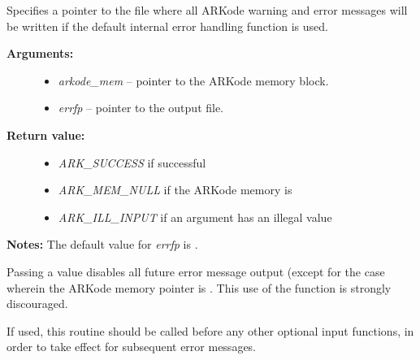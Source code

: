 \documentclass[letterpaper,10pt,english]{sphinxmanual}
\begin{document}
\begin{fulllineitems}
\label{c_interface/User_callable:c.ARKodeSetErrFile}
Specifies a pointer to the file where all ARKode warning and error
messages will be written if the default internal error handling
function is used.
\begin{description}
\item[{\textbf{Arguments:}}] \leavevmode\begin{itemize}
\item {} 
\emph{arkode\_mem} -- pointer to the ARKode memory block.

\item {} 
\emph{errfp} -- pointer to the output file.

\end{itemize}

\item[{\textbf{Return value:}}] \leavevmode\begin{itemize}
\item {} 
\emph{ARK\_SUCCESS} if successful

\item {} 
\emph{ARK\_MEM\_NULL} if the ARKode memory is 

\item {} 
\emph{ARK\_ILL\_INPUT} if an argument has an illegal value

\end{itemize}

\end{description}

\textbf{Notes:} The default value for \emph{errfp} is .

Passing a  value disables all future error message output
(except for the case wherein the ARKode memory pointer is
.  This use of the function is strongly discouraged.

If used, this routine should be called before any other
optional input functions, in order to take effect for subsequent
error messages.

\end{fulllineitems}

\end{document}
